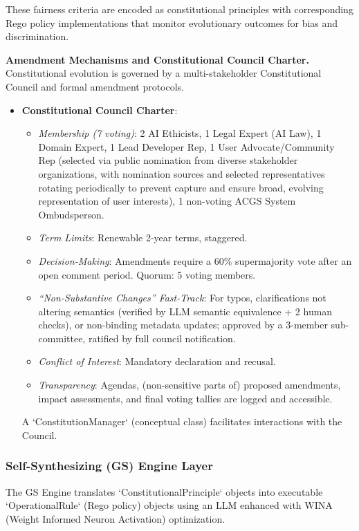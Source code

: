\documentclass[manuscript,screen,review,anonymous,9pt]{acmart}
\begin{document}
These fairness criteria are encoded as constitutional principles with corresponding Rego policy implementations that monitor evolutionary outcomes for bias and discrimination.

\textbf{Amendment Mechanisms and Constitutional Council Charter.} Constitutional evolution is governed by a multi-stakeholder Constitutional Council and formal amendment protocols.
\begin{itemize}
    \item \textbf{Constitutional Council Charter}:
    \begin{itemize}
        \item \textit{Membership (7 voting)}: 2 AI Ethicists, 1 Legal Expert (AI Law), 1 Domain Expert, 1 Lead Developer Rep, 1 User Advocate/Community Rep (selected via public nomination from diverse stakeholder organizations, with nomination sources and selected representatives rotating periodically to prevent capture and ensure broad, evolving representation of user interests), 1 non-voting ACGS System Ombudsperson.
        \item \textit{Term Limits}: Renewable 2-year terms, staggered.
        \item \textit{Decision-Making}: Amendments require a 60\% supermajority vote after an open comment period. Quorum: 5 voting members.
        \item \textit{``Non-Substantive Changes'' Fast-Track}: For typos, clarifications not altering semantics (verified by LLM semantic equivalence + 2 human checks), or non-binding metadata updates; approved by a 3-member sub-committee, ratified by full council notification.
        \item \textit{Conflict of Interest}: Mandatory declaration and recusal.
        \item \textit{Transparency}: Agendas, (non-sensitive parts of) proposed amendments, impact assessments, and final voting tallies are logged and accessible.
    \end{itemize}
    A `ConstitutionManager` (conceptual class) facilitates interactions with the Council.
\end{itemize}

\subsubsection{Self-Synthesizing (GS) Engine Layer}
The GS Engine translates `ConstitutionalPrinciple` objects into executable `OperationalRule` (Rego policy) objects using an LLM enhanced with WINA (Weight Informed Neuron Activation) optimization.
\end{document}
